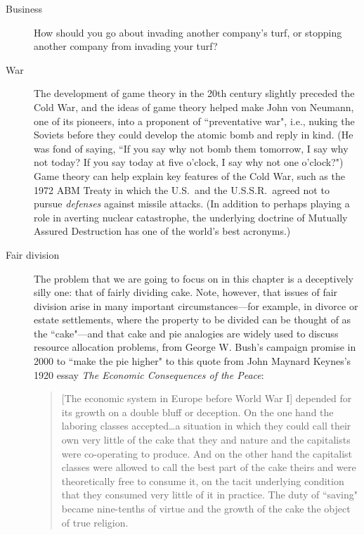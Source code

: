 \begin{description}
\item[Business] How should you go about invading another company's turf, or stopping another company from invading your turf?

\item[War] The development of game theory in the 20th century slightly preceded the Cold War, and the ideas of game theory helped make John von Neumann, one of its pioneers, into a proponent of ``preventative war", i.e., nuking the Soviets before they could develop the atomic bomb and reply in kind. (He was fond of saying, ``If you say why not bomb them tomorrow, I say why not today? If you say today at five o'clock, I say why not one o'clock?") Game theory can help explain key features of the Cold War, such as the 1972 ABM Treaty in which the U.S.\ and the U.S.S.R.\ agreed not to pursue \emph{defenses} against missile attacks. (In addition to perhaps playing a role in averting nuclear catastrophe, the underlying doctrine of Mutually Assured Destruction has one of the world's best acronyms.)

\item[Fair division] The problem that we are going to focus on in this chapter is a deceptively silly one: that of fairly dividing cake. Note, however, that issues of fair division arise in many important circumstances---for example, in divorce or estate settlements, where the property to be divided can be thought of as the ``cake"---and that cake and pie analogies are widely used to discuss resource allocation problems, from George W. Bush's campaign promise in 2000 to ``make the pie higher" to this quote from John Maynard Keynes's 1920 essay \emph{The Economic Consequences of the Peace}:



\begin{quote}
[The economic system in Europe before World War I] depended for its growth on a double bluff or deception. On the one hand the laboring classes accepted\ldots a situation in which they could call their own very little of the cake that they and nature and the capitalists were co-operating to produce. And on the other hand the capitalist classes were allowed to call the best part of the cake theirs and were theoretically free to consume it, on the tacit underlying condition that they consumed very little of it in practice. The duty of ``saving" became nine-tenths of virtue and the growth of the cake the object of true religion.
\end{quote}


\end{description}





